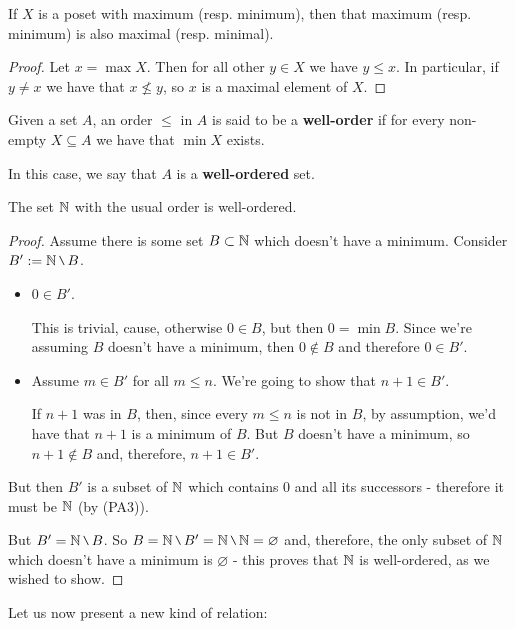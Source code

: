 \begin{lemma}
	If $X$ is a poset with maximum (resp. minimum), then that maximum (resp. minimum) is also maximal (resp. minimal).
\end{lemma}
\begin{proof}
	Let $x=\max X$. Then for all other $y\in X$ we have $y\leq x$. In particular, if $y\neq x$ we have that $x\not\leq y$, so $x$ is a maximal element of $X$.
\end{proof}

\begin{df}
	Given a set $A$, an order $\leq $ in $A$ is said to be a \textbf{well-order} if for every non-empty $X\subseteq A$ we have that $\min X$ exists.
	
	In this case, we say that $A$ is a \textbf{well-ordered} set.
\end{df}

\begin{theorem}
	The set $\mathbb N$ with the usual order is well-ordered.
\end{theorem}
\begin{proof}
	Assume there is some set $B\subset\mathbb N$ which doesn't have a minimum. Consider $B':=\N\setminus B$.
	
	\begin{itemize}
		\item $0\in B'$.
		
		This is trivial, cause, otherwise $0\in B$, but then $0=\min B$. Since we're assuming $B$ doesn't have a minimum, then $0\notin B$ and therefore $0\in B'$.
		
		\item Assume $m\in B'$ for all $m\leq n$. We're going to show that $n+1\in B'$.
		
		If $n+1$ was in $B$, then, since every $m\leq n$ is not in $B$, by assumption, we'd have that $n+1$ is a minimum of $B$. But $B$ doesn't have a minimum, so $n+1\notin B$ and, therefore, $n+1\in B'$.
	\end{itemize}

But then $B'$ is a subset of $\mathbb N$ which contains $0$ and all its successors - therefore it must be $\mathbb N$ (by (PA3)).

But $B'=\N\setminus B$. So $B=\N\setminus B'=\N\setminus\N=\varnothing$ and, therefore, the only subset of $\mathbb N$ which doesn't have a minimum is $\varnothing$ - this proves that $\mathbb N$ is well-ordered, as we wished to show.
\end{proof}

Let us now present a new kind of relation:

